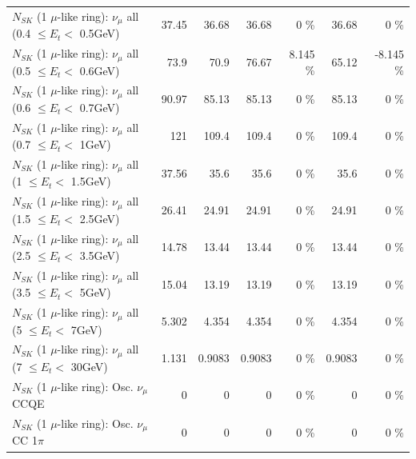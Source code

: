 \begin{table}
\begin{tabular}{| l | r | r | r  r | r  r |}
       $N_{SK}$ (1 $\mu$-like ring): $\nu_{\mu}$ all (0.4 $\leq E_{t} <$ 0.5GeV) &           37.45 &           36.68 &           36.68 &        0 \%  &           36.68 &        0 \%  \\ 
       $N_{SK}$ (1 $\mu$-like ring): $\nu_{\mu}$ all (0.5 $\leq E_{t} <$ 0.6GeV) &            73.9 &            70.9 &           76.67 &    8.145 \%  &           65.12 &   -8.145 \%  \\ 
       $N_{SK}$ (1 $\mu$-like ring): $\nu_{\mu}$ all (0.6 $\leq E_{t} <$ 0.7GeV) &           90.97 &           85.13 &           85.13 &        0 \%  &           85.13 &        0 \%  \\ 
         $N_{SK}$ (1 $\mu$-like ring): $\nu_{\mu}$ all (0.7 $\leq E_{t} <$ 1GeV) &             121 &           109.4 &           109.4 &        0 \%  &           109.4 &        0 \%  \\ 
         $N_{SK}$ (1 $\mu$-like ring): $\nu_{\mu}$ all (1 $\leq E_{t} <$ 1.5GeV) &           37.56 &            35.6 &            35.6 &        0 \%  &            35.6 &        0 \%  \\ 
       $N_{SK}$ (1 $\mu$-like ring): $\nu_{\mu}$ all (1.5 $\leq E_{t} <$ 2.5GeV) &           26.41 &           24.91 &           24.91 &        0 \%  &           24.91 &        0 \%  \\ 
       $N_{SK}$ (1 $\mu$-like ring): $\nu_{\mu}$ all (2.5 $\leq E_{t} <$ 3.5GeV) &           14.78 &           13.44 &           13.44 &        0 \%  &           13.44 &        0 \%  \\ 
         $N_{SK}$ (1 $\mu$-like ring): $\nu_{\mu}$ all (3.5 $\leq E_{t} <$ 5GeV) &           15.04 &           13.19 &           13.19 &        0 \%  &           13.19 &        0 \%  \\ 
           $N_{SK}$ (1 $\mu$-like ring): $\nu_{\mu}$ all (5 $\leq E_{t} <$ 7GeV) &           5.302 &           4.354 &           4.354 &        0 \%  &           4.354 &        0 \%  \\ 
          $N_{SK}$ (1 $\mu$-like ring): $\nu_{\mu}$ all (7 $\leq E_{t} <$ 30GeV) &           1.131 &          0.9083 &          0.9083 &        0 \%  &          0.9083 &        0 \%  \\ 
\hline
\hline
                               $N_{SK}$ (1 $\mu$-like ring): Osc. $\nu_\mu$ CCQE &               0 &               0 &               0 &        0 \%  &               0 &        0 \%  \\ 
                          $N_{SK}$ (1 $\mu$-like ring): Osc. $\nu_\mu$ CC 1$\pi$ &               0 &               0 &               0 &        0 \%  &               0 &        0 \%  \\ 

\end{tabular}
\end{table}
